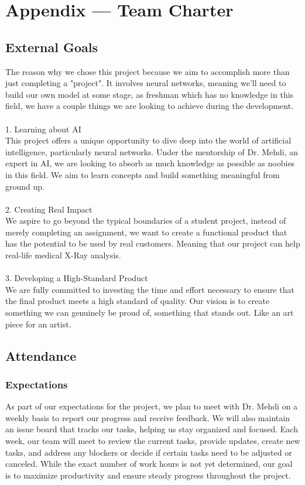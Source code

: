 \documentclass{article}
\begin{document}
\newpage{}

\section*{Appendix --- Team Charter}

\subsection*{External Goals}
The reason why we chose this project because we aim to accomplish more than just completing a "project". It involves neural networks, meaning we'll need to build our own model at some stage, as freshman which has no knowledge in this field, we have a couple things we are looking to achieve during the development. \\\\
1. Learning about AI \\
This project offers a unique opportunity to dive deep into the world of artificial intelligence, particularly neural networks. Under the mentorship of Dr. Mehdi, an expert in AI, we are looking to absorb as much knowledge as possible as noobies in this field. We aim to learn concepts and build something meaningful from ground up.\\\\
2. Creating Real Impact \\
We aspire to go beyond the typical boundaries of a student project, instead of merely completing an assignment, we want to create a functional product that has the potential to be used by real customers. Meaning that our project can help real-life medical X-Ray analysis. \\\\
3. Developing a High-Standard Product \\
We are fully committed to investing the time and effort necessary to ensure that the final product meets a high standard of quality. Our vision is to create something we can genuinely be proud of, something that stands out. Like an art piece for an artist.
\subsection*{Attendance}

\subsubsection*{Expectations}
As part of our expectations for the project, we plan to meet with Dr. Mehdi on a weekly basis to report our progress and receive feedback. We will also maintain an issue board that tracks our tasks, helping us stay organized and focused. Each week, our team will meet to review the current tasks, provide updates, create new tasks, and address any blockers or decide if certain tasks need to be adjusted or canceled. While the exact number of work hours is not yet determined, our goal is to maximize productivity and ensure steady progress throughout the project.
\end{document}
